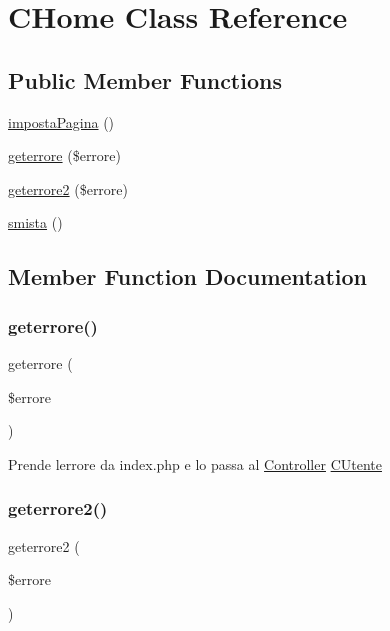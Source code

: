 \hypertarget{class_c_home}{}\section{C\+Home Class Reference}
\label{class_c_home}
\subsection*{Public Member Functions}
\begin{DoxyCompactItemize}
\item 
\mbox{\hyperlink{class_c_home_a711c4b2a5339ead56b3957d242895d96}{imposta\+Pagina}} ()
\item 
\mbox{\hyperlink{class_c_home_ab28e8f80f2f05f7226c6972dbc6be413}{geterrore}} (\$errore)
\item 
\mbox{\hyperlink{class_c_home_ac951ad0befac420dc5863c2f534c258c}{geterrore2}} (\$errore)
\item 
\mbox{\hyperlink{class_c_home_afc7ba180569cef3535974cfc4a1211f1}{smista}} ()
\end{DoxyCompactItemize}


\subsection{Member Function Documentation}
\mbox{\label{class_c_home_ab28e8f80f2f05f7226c6972dbc6be413}} 
\subsubsection{\texorpdfstring{geterrore()}{geterrore()}}
{\footnotesize\ttfamily geterrore (\begin{DoxyParamCaption}\item[{}]{\$errore }\end{DoxyParamCaption})}

Prende l\textquotesingle{}errore da index.\+php e lo passa al \mbox{\hyperlink{namespace_controller}{Controller}} \mbox{\hyperlink{class_c_utente}{C\+Utente}} \mbox{\label{class_c_home_ac951ad0befac420dc5863c2f534c258c}} 
\subsubsection{\texorpdfstring{geterrore2()}{geterrore2()}}
{\footnotesize\ttfamily geterrore2 (\begin{DoxyParamCaption}\item[{}]{\$errore }\end{DoxyParamCaption})}

